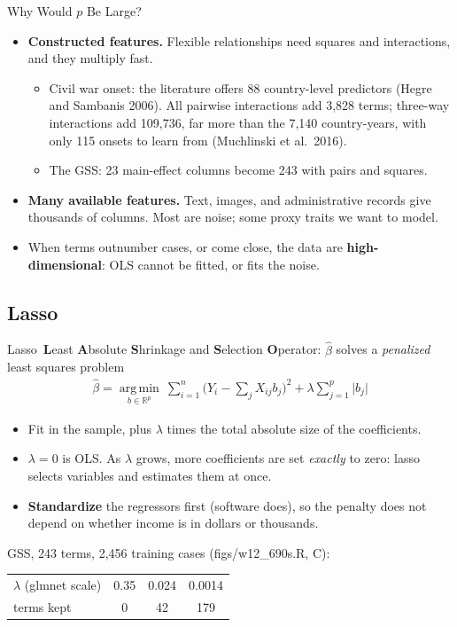 \documentclass[aspectratio=169,11pt,xcolor=dvipsnames]{beamer}
\newcommand{\srcp}[1]{{\scriptsize\color{gray}(#1)}}
\DeclareMathOperator*{\argminop}{arg\,min}
\newcommand{\argmin}{\argminop\limits}
\newcommand{\R}{\mathbb{R}}
\newcommand{\core}{\,\raisebox{0.6pt}{\textcolor{corestar}{$\bigstar$}}}
\begin{document}
\begin{frame}{Why Would $p$ Be Large?}
\begin{itemize}\itemsep8pt
  \item \textbf{Constructed features.} Flexible relationships need squares and interactions,
        and they multiply fast.
  \begin{itemize}\itemsep2pt
    \item Civil war onset: the literature offers 88 country-level predictors
          \srcp{Hegre and Sambanis 2006}. All pairwise interactions add 3,828 terms; three-way
          interactions add 109,736, far more than the 7,140 country-years, with only 115 onsets
          to learn from \srcp{Muchlinski et al.\ 2016}.
    \item The GSS: 23 main-effect columns become 243 with pairs and squares.
  \end{itemize}
  \item \textbf{Many available features.} Text, images, and administrative records give
        thousands of columns. Most are noise; some proxy traits we want to model.
  \item When terms outnumber cases, or come close, the data are \textbf{high-dimensional}: OLS
        cannot be fitted, or fits the noise.
\end{itemize}
\end{frame}

\subsection{Lasso}

\begin{frame}{Lasso\core}
\textbf{L}east \textbf{A}bsolute \textbf{S}hrinkage and \textbf{S}election
\textbf{O}perator: $\hat\beta$ solves a \textit{penalized} least squares problem
\begin{align*}
  \hat\beta = \argmin_{b\in\R^{p}}\ \sum_{i=1}^n\big(Y_i - \textstyle\sum_{j} X_{ij} b_j\big)^2
  + \lambda \sum_{j=1}^{p}\big|b_j\big|
\end{align*}
\begin{itemize}\itemsep3pt
  \item Fit in the sample, plus $\lambda$ times the total absolute size of the coefficients.
  \item $\lambda = 0$ is OLS. As $\lambda$ grows, more coefficients are set
        \emph{exactly} to zero: lasso selects variables and estimates them at once.
  \item \textbf{Standardize} the regressors first (software does), so the penalty does
        not depend on whether income is in dollars or thousands.
\end{itemize}
\vskip-2pt
\begin{center}\small
GSS, 243 terms, 2,456 training cases \srcp{figs/w12\_690s.R, C}:\quad
\begin{tabular}{@{}lccc@{}}
\toprule
$\lambda$ (glmnet scale) & 0.35 & 0.024 & 0.0014 \\
terms kept & 0 & 42 & 179 \\
\bottomrule
\end{tabular}
\end{center}
\end{frame}
\end{document}
